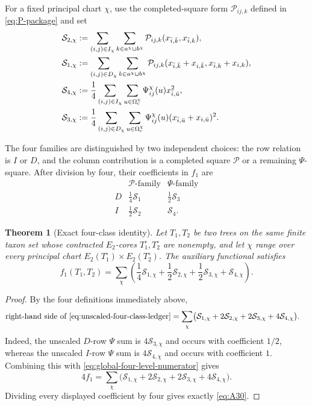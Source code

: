 \documentclass[11pt]{article}
\newtheorem{theorem}{Theorem}[section]
\begin{document}
For a fixed principal chart $\chi$, use the completed-square form
$\mathcal P_{ij,k}$ defined in \eqref{eq:P-package} and set
\begin{align}
\mathcal S_{2,\chi}
&:=\sum_{(i,j)\in I_\chi}\sum_{k\in a^\chi\cup b^\chi}
  \mathcal P_{ij,k}(x_{\bar i,\bar k},x_{\bar i,k}),
\label{eq:S2-family}\\
\mathcal S_{1,\chi}
&:=\sum_{(i,j)\in D_\chi}\sum_{k\in a^\chi\cup b^\chi}
  \mathcal P_{ij,k}(x_{\bar i,\bar k}+x_{i,\bar k},
                    x_{\bar i,k}+x_{i,k}),
\label{eq:S1-family}\\
\mathcal S_{4,\chi}
&:=\frac14\sum_{(i,j)\in I_\chi}
 \sum_{u\in\Omega_{\rm c}^\chi}
 \Psi_{ij}^\chi(u)x_{\bar i,\bar u}^{2},
\label{eq:S4-family}\\
\mathcal S_{3,\chi}
&:=\frac14\sum_{(i,j)\in D_\chi}
 \sum_{u\in\Omega_{\rm c}^\chi}
 \Psi_{ij}^\chi(u)(x_{\bar i,\bar u}+x_{i,\bar u})^{2}.
\label{eq:S3-family}
\end{align}

The four families are distinguished by two independent choices: the row
relation is $I$ or $D$, and the column contribution is a completed square
$\mathcal P$ or a remaining $\Psi$-square.  After division by four, their
coefficients in $f_1$ are
\[
\begin{array}{c|cc}
&\mathcal P\text{-family}&\Psi\text{-family}\\
\hline
D&\frac14\mathcal S_1&\frac12\mathcal S_3\\
I&\frac12\mathcal S_2&\mathcal S_4.
\end{array}
\]

\begin{theorem}[Exact four-class identity]\label{thm:four-family-incidence}
Let $T_1,T_2$ be two trees on the same finite taxon set whose contracted
$E_2$-cores $T_1^\circ,T_2^\circ$ are nonempty, and let $\chi$ range over
every principal chart
$E_2(T_1^\circ)\times E_2(T_2^\circ)$.  The auxiliary functional satisfies
\begin{equation}\label{eq:A30}
 f_1(T_1,T_2)=
 \sum_\chi\left(
 \frac14\mathcal S_{1,\chi}
 +\frac12\mathcal S_{2,\chi}
 +\frac12\mathcal S_{3,\chi}
 +\mathcal S_{4,\chi}\right).
\tag{A.30}
\end{equation}
\end{theorem}

\begin{proof}
By the four definitions immediately above,
\[
\begin{aligned}
\text{right-hand side of \eqref{eq:unscaled-four-class-ledger}}
&=\sum_\chi\bigl(
\mathcal S_{1,\chi}
+2\mathcal S_{2,\chi}
+2\mathcal S_{3,\chi}
+4\mathcal S_{4,\chi}\bigr).
\end{aligned}
\]
Indeed, the unscaled $D$-row $\Psi$ sum is $4\mathcal S_{3,\chi}$ and occurs
with coefficient $1/2$, whereas the unscaled $I$-row $\Psi$ sum is
$4\mathcal S_{4,\chi}$ and occurs with coefficient $1$.  Combining this
with \eqref{eq:global-four-level-numerator} gives
\[
4f_1
=\sum_\chi\bigl(
\mathcal S_{1,\chi}
+2\mathcal S_{2,\chi}
+2\mathcal S_{3,\chi}
+4\mathcal S_{4,\chi}\bigr).
\]
Dividing every displayed coefficient by four gives exactly \eqref{eq:A30}.
\end{proof}
\end{document}
